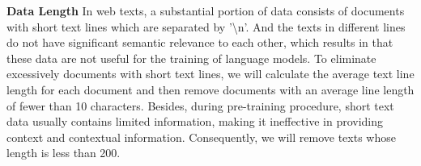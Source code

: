 \documentclass{article}
\begin{document}

\textbf{Data Length} In web texts, a substantial portion of data consists of documents with short text lines which are separated by '\textbackslash n'. And the texts in different lines do not have significant semantic relevance to each other, which results in that these data are not useful for the training of language models. To eliminate excessively documents with short text lines, we will calculate the average text line length for each document and then remove documents with an average line length of fewer than 10 characters. Besides, during pre-training procedure, short text data usually contains limited information, making it ineffective in providing context and contextual information. Consequently, we will remove texts whose length is less than 200.



\end{document}
